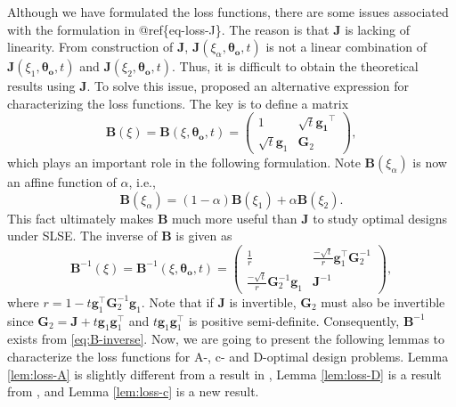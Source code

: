 \documentclass[
]{book}
\theoremstyle{definition}
\theoremstyle{definition}
\theoremstyle{definition}
\theoremstyle{definition}
\theoremstyle{remark}
\begin{document}
Although we have formulated the loss functions, there are some issues associated with the formulation in @ref\{eq-loss-J\}. The reason is that \(\boldsymbol{J}\) is lacking of linearity. From construction of \(\boldsymbol{J}\), \(\boldsymbol{J}(\xi_{\alpha},\boldsymbol{\theta_o},t)\) is not a linear combination of \(\boldsymbol{J}(\xi_{1},\boldsymbol{\theta_o},t)\) and \(\boldsymbol{J}(\xi_{2},\boldsymbol{\theta_o},t)\). Thus, it is difficult to obtain the theoretical results using \(\boldsymbol{J}\). To solve this issue, \citet{gao2017d} proposed an alternative expression for characterizing the loss functions. The key is to define a matrix
\begin{equation}
\boldsymbol{B}(\xi)=\boldsymbol{B}(\xi,\boldsymbol{\theta_o},t)=
\begin{pmatrix}
1               &   \sqrt{t}\boldsymbol{g_1}^\top\\
\sqrt{t}\boldsymbol{g}_1    &   \boldsymbol{G}_2
\end{pmatrix},
 \label{eq:B-matrix}
\end{equation}
which plays an important role in the following formulation. Note \(\boldsymbol{B}(\xi_{\alpha})\) is now an affine function of \(\alpha\), i.e.,
\[ \boldsymbol{B}(\xi_{\alpha})=(1-\alpha)\boldsymbol{B}(\xi_1)+\alpha\boldsymbol{B}(\xi_2).\]
This fact ultimately makes \(\boldsymbol{B}\) much more useful than \(\boldsymbol{J}\) to study optimal designs under SLSE. The inverse of \(\boldsymbol{B}\) is given as
\begin{equation}
\boldsymbol{B}^{-1}(\xi)=\boldsymbol{B}^{-1}(\xi,\boldsymbol{\theta_o},t)   =\begin{pmatrix}
\frac{1}{r}             &   \frac{-\sqrt{t}}{r}\boldsymbol{g}_1^\top\boldsymbol{G}_2^{-1}   \\
\frac{-\sqrt{t}}{r}\boldsymbol{G}_2^{-1}\boldsymbol{g}_1    &\boldsymbol{J}^{-1}
\end{pmatrix},
 \label{eq:B-inverse}
\end{equation}
where \(r=1-t\boldsymbol{g}_1^\top\boldsymbol{G}_2^{-1}\boldsymbol{g}_1\). Note that if \(\boldsymbol{J}\) is invertible, \(\boldsymbol{G}_2\) must also be invertible since \(\boldsymbol{G}_2=\boldsymbol{J}+t\boldsymbol{g}_1\boldsymbol{g}_1^\top\) and \(t\boldsymbol{g}_1\boldsymbol{g}_1^\top\) is positive semi-definite. Consequently, \(\boldsymbol{B}^{-1}\) exists from \eqref{eq:B-inverse}. Now, we are going to present the following lemmas to characterize the loss functions for A-, c- and D-optimal design problems. Lemma \ref{lem:loss-A} is slightly different from a result in \citet{yin2018optimal}, Lemma \ref{lem:loss-D} is a result from \citet{gao2017d}, and Lemma \ref{lem:loss-c} is a new result.
\end{document}
